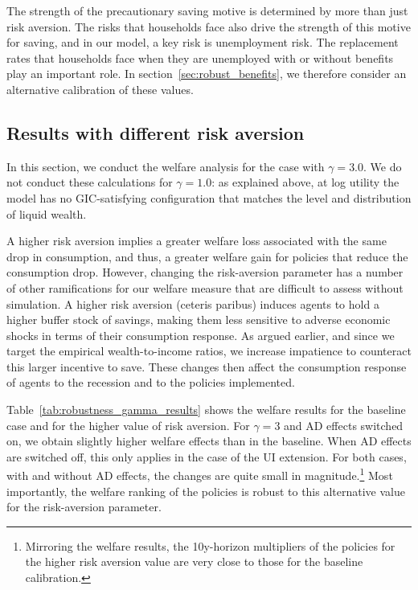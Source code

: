 \documentclass[\latexroot/\projectname]{subfiles}
\begin{document}


The strength of the precautionary saving motive is determined by more than just risk aversion.
The risks that households face also drive the strength of this motive for saving, and in our model, a key risk is unemployment risk.
The replacement rates that households face when they are unemployed with or without benefits play an important role.
In section~\ref{sec:robust_benefits}, we therefore consider an alternative calibration of these values.

\subsection*{Results with different risk aversion}
\whenintegrated{\label{sec:robust_gamma_results}} %

In this section, we conduct the welfare analysis for the case with $\gamma=3.0$.
We do not conduct these calculations for $\gamma=1.0$: as explained above, at log utility the model has no GIC-satisfying configuration that matches the level and distribution of liquid wealth.

A higher risk aversion implies a greater welfare loss associated with the same drop in consumption, and thus, a greater welfare gain for policies that reduce the consumption drop.
However, changing the risk-aversion parameter has a number of other ramifications for our welfare measure that are difficult to assess without simulation.
A higher risk aversion (ceteris paribus) induces agents to hold a higher buffer stock of savings, making them less sensitive to adverse economic shocks in terms of their consumption response.
As argued earlier, and since we target the empirical wealth-to-income ratios, we increase impatience to counteract this larger incentive to save.
These changes then affect the consumption response of agents to the recession and to the policies implemented.

Table~\ref{tab:robustness_gamma_results} shows the welfare results for the baseline case and for the higher value of risk aversion.
For $\gamma=3$ and AD effects switched on, we obtain slightly higher welfare effects than in the baseline.
When AD effects are switched off, this only applies in the case of the UI extension.
For both cases, with and without AD effects, the changes are quite small in magnitude.\footnote{Mirroring the welfare results, the 10y-horizon multipliers of the policies for the higher risk aversion value are very close to those for the baseline calibration.} Most importantly, the welfare ranking of the policies is robust to this alternative value for the risk-aversion parameter.
\end{document}
